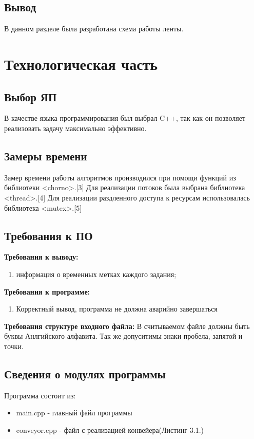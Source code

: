 \documentclass[12pt]{report}
\begin{document}
	\section*{Вывод}
	
	В данном разделе была разработана схема работы ленты.
	
	\chapter{Технологическая часть}
	
	\section{Выбор ЯП}
	В качестве языка программирования был выбрал C++, так как он позволяет реализовать задачу максимально эффективно.
	
	\section{Замеры времени}
	Замер времени работы алгоритмов производился при помощи функций из библиотеки <chorno>.[3] Для реализации потоков была выбрана библиотека <thread>.[4] Для реализации раздленного доступа к ресурсам использовалась библиотека <mutex>.[5]
	
	\section{Требования к ПО}
	
	\textbf{Требования к выводу:}
	\begin{enumerate}
		\item информация о временных метках каждого задания;
	\end{enumerate}
	\textbf{Требования к программе:}
	\begin{enumerate}
		\item Корректный вывод, программа не должна аварийно завершаться
	\end{enumerate}
	
	\textbf{Требования структуре входного файла:}
	В считываемом файле должны быть буквы Анлгийского алфавита. Так же допуситимы знаки пробела, запятой и точки.
	
	\section{Сведения о модулях программы}
	Программа состоит из:
	\begin{itemize}
		\item main.cpp - главный файл программы
		\item conveyor.cpp - файл с реализацией конвейера(Листинг 3.1.)
	\end{itemize}
	
\end{document}
